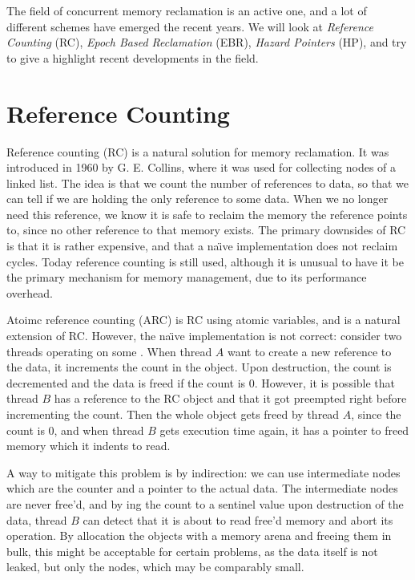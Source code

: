 \documentclass[b5paper]{report}
\begin{document}
The field of concurrent memory reclamation is an active one, and a lot of
different schemes have emerged the recent years. We will look at \emph{Reference
Counting} (RC), \emph{Epoch Based Reclamation} (EBR), \emph{Hazard Pointers}
(HP), and try to give a highlight recent developments in the field.

\section{Reference Counting}
Reference counting (RC) is a natural solution for memory reclamation. It was
introduced in 1960 by G. E.  Collins\cite{collins1960method}, where it was used
for collecting nodes of a linked list.  The idea is that we count the number of
references to data, so that we can tell if we are holding the only reference to
some data. When we no longer need this reference, we know it is safe to reclaim
the memory the reference points to, since no other reference to that memory
exists. The primary downsides of RC is that it is rather expensive, and that a
na\"\i{}ve implementation does not reclaim cycles. Today reference counting is
still used, although it is unusual to have it be the primary mechanism for
memory management, due to its performance overhead.

Atoimc reference counting (ARC) is RC using atomic variables, and is a natural
extension of RC\@. However, the na\"\i{}ve implementation is not correct:
consider two threads operating on some . When thread $A$ want to
create a new reference to the data, it increments the count in the 
object. Upon destruction, the count is decremented and the data is freed if the
count is 0. However, it is possible that thread $B$ has a reference to the RC
object and that it got preempted right before incrementing the count. Then the
whole object gets freed by thread $A$, since the count is 0, and when thread $B$
gets execution time again, it has a pointer to freed memory which it indents to
read.

A way to mitigate this problem is by indirection: we can use intermediate
 nodes which are the counter and a pointer to the actual data. The
intermediate nodes are never free'd, and by ing the count to a
sentinel value upon destruction of the data, thread $B$ can detect that it is
about to read free'd memory and abort its operation. By allocation the 
objects with a memory arena and freeing them in bulk, this might be acceptable
for certain problems, as the data itself is not leaked, but only the 
nodes, which may be comparably small.
\end{document}
